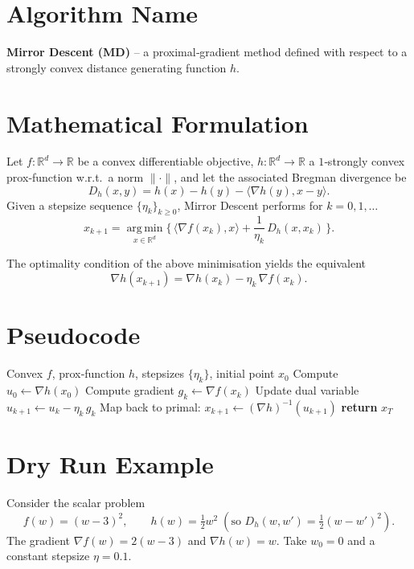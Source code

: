 \documentclass{article}
\newcommand{\argmin}{\operatorname*{arg\,min}}
\newcommand{\Breg}[2]{D_{h}(#1,#2)}
\newcommand{\inner}[2]{\langle #1,#2\rangle}
\newcommand{\grad}{\nabla}
\begin{document}
\section*{Algorithm Name}
\textbf{Mirror Descent (MD)} – a proximal‑gradient method defined with respect to a
strongly convex distance generating function $h$.

\vspace{0.5em}
\section*{Mathematical Formulation}
Let $f:\mathbb{R}^{d}\rightarrow\mathbb{R}$ be a convex differentiable objective,
$h:\mathbb{R}^{d}\rightarrow\mathbb{R}$ a $1$‑strongly convex prox‑function w.r.t.\ a norm
$\|\cdot\|$, and let the associated Bregman divergence be
\[
\Breg{x}{y}=h(x)-h(y)-\inner{\grad h(y)}{x-y}.
\]
Given a stepsize sequence $\{\eta_k\}_{k\ge 0}$, Mirror Descent performs for $k=0,1,\dots$
\[
\boxed{
x_{k+1}= \argmin_{x\in\mathbb{R}^{d}}
\Big\{\,\inner{\grad f(x_k)}{x}+ \frac{1}{\eta_k}\,\Breg{x}{x_k}\,\Big\}.
}
\tag{MD}
\]

The optimality condition of the above minimisation yields the equivalent
\[
\grad h(x_{k+1}) = \grad h(x_k)-\eta_k\,\grad f(x_k). \tag{1}
\]

\vspace{0.5em}
\section*{Pseudocode}
\begin{algorithm}[H]
\caption{Mirror Descent}
\begin{algorithmic}[1]
\Require Convex $f$, prox‑function $h$, stepsizes $\{\eta_k\}$, initial point $x_0$
\State Compute $u_0 \gets \grad h(x_0)$
    \State Compute gradient $g_k \gets \grad f(x_k)$
    \State Update dual variable $u_{k+1} \gets u_k - \eta_k\, g_k$
    \State Map back to primal: $x_{k+1} \gets (\grad h)^{-1}(u_{k+1})$
\EndFor
\State \textbf{return} $x_T$
\end{algorithmic}
\end{algorithm}

\vspace{0.5em}
\section*{Dry Run Example}
Consider the scalar problem 
\[
f(w) = (w-3)^2,\qquad h(w)=\tfrac12 w^{2} \;( \text{so } \Breg{w}{w'}=\tfrac12 (w-w')^{2}).
\]
The gradient $\grad f(w)=2(w-3)$ and $\grad h(w)=w$.
Take $w_0=0$ and a constant stepsize $\eta=0.1$.
\end{document}
